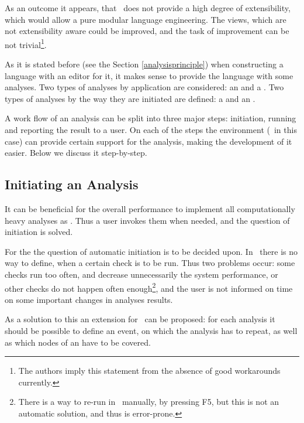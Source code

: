 As an outcome it appears, that \jbmps\ does not provide a high degree of extensibility, which would allow 
a pure modular language engineering. The views, which are not extensibility aware could be improved, and the
task of improvement can be not trivial\footnote{The authors imply this statement from the absence of good workarounds currently.}.











As it is stated before (see the Section \ref{analysisprinciple}) when constructing a language with an editor for it, 
it makes sense to provide the language with some analyses. Two types of analyses by application are considered: an
 and a . Two types of analyses by the way they are initiated are defined: a
 and an .

A work flow of an analysis can be split into three major steps: initiation, running and reporting the result to a user.
On each of the steps the environment (\jbmps\ in this case) can provide certain support for the analysis, making the 
development of it easier. Below we discuss it step-by-step.

\subsection{Initiating an Analysis}

It can be beneficial for the overall  performance to implement all computationally heavy analyses 
as . Thus a user invokes them when needed, and the question of initiation is solved.

For the  the question of automatic initiation is to be decided upon. In \jbmps\ there is no 
way to define, when a certain check is to be run. Thus two problems occur: some checks run too often, and 
decrease unnecessarily the system performance, or other checks do not happen often enough\footnote{There is a way to re-run  in \jbmps\ manually,
by pressing F5, but this is not an automatic solution, and thus is error-prone.}, and the user is not 
informed on time on  some important changes in analyses results. 

As a solution to this an  extension for \jbmps\ can be proposed: for each analysis it should be possible 
to define an event, on which the analysis has to repeat, as well as which nodes of an  have to be covered.

